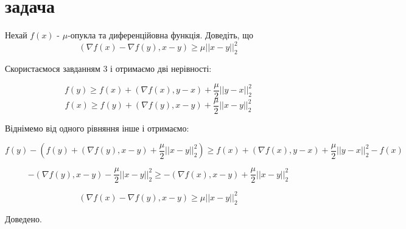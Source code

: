 
\section{задача}


\begin{tcolorbox}[title = Умова]
    Нехай $f(x)$ - $\mu$-опукла та диференційовна функція. Доведіть, що 
    \begin{equation}
        (\nabla f(x) - \nabla f(y), x - y) \geq \mu ||x - y||_2^2
    \end{equation}
\end{tcolorbox}

Скористаємося завданням 3 і отримаємо дві нерівності:

$$f(y) \geq f(x) + (\nabla f(x), y - x) + \frac{\mu}{2} ||y - x||_2^2$$
$$f(x) \geq f(y) + (\nabla f(y), x - y) + \frac{\mu}{2} ||x - y||_2^2$$

Віднімемо від одного рівняння інше і отримаємо:

$$f(y) - (f(y) + (\nabla f(y), x - y) + \frac{\mu}{2} ||x - y||_2^2) 
\geq f(x) + (\nabla f(x), y - x) + \frac{\mu}{2} ||y - x||_2^2 - f(x)$$

$$ -(\nabla f(y), x - y) - \frac{\mu}{2} ||x - y||_2^2 \geq 
-(\nabla f(x), x - y) + \frac{\mu}{2} ||x - y||_2^2$$


$$(\nabla f(x) - \nabla f(y), x - y) \geq \mu ||x - y||_2^2$$


Доведено.